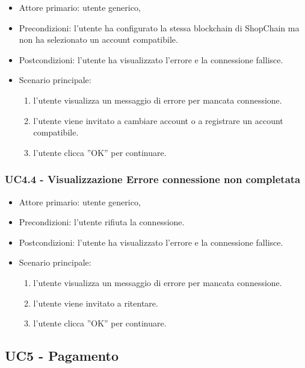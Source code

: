 \begin{itemize}
    \item Attore primario: utente generico,
    \item Precondizioni: l'utente ha configurato la stessa blockchain di ShopChain ma non ha selezionato un account compatibile.
    \item Postcondizioni: l'utente ha visualizzato l'errore e la connessione fallisce.
    \item Scenario principale: \begin{enumerate}
        \item l'utente visualizza un messaggio di errore per mancata connessione.
        \item l'utente viene invitato a cambiare account o a registrare un account compatibile.
        \item l’utente clicca ”OK” per continuare.
    \end{enumerate}
\end{itemize}

\subsubsection{UC4.4 - Visualizzazione Errore connessione non completata}

\begin{itemize}
    \item Attore primario: utente generico,
    \item Precondizioni: l'utente rifiuta la connessione.
    \item Postcondizioni: l'utente ha visualizzato l'errore e la connessione fallisce.
    \item Scenario principale: \begin{enumerate}
        \item l'utente visualizza un messaggio di errore per mancata connessione.
        \item l'utente viene invitato a ritentare.
        \item l’utente clicca ”OK” per continuare.
    \end{enumerate}
\end{itemize}

\subsection{UC5 - Pagamento}

